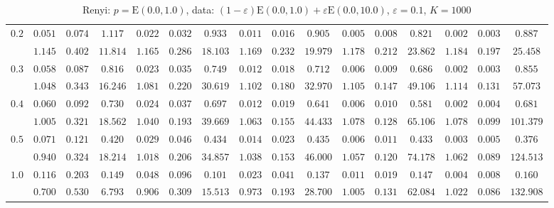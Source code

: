 \begin{table}[ht]
\begin{center}
\begin{tabular}{|c|ccc|ccc|ccc|ccc|ccc|}
\hline 
$0.2$ & $ 0.051 $ & $ 0.074 $ & $ 1.117 $ & $ 0.022 $ & $ 0.032 $ & $ 0.933 $ & $ 0.011 $ & $ 0.016 $ & $ 0.905 $ & $ 0.005 $ & $ 0.008 $ & $ 0.821 $ & $ 0.002 $ & $ 0.003 $ & $ 0.887 $\\ 
 & $ 1.145 $ & $ 0.402 $ & $ 11.814 $ & $ 1.165 $ & $ 0.286 $ & $ 18.103 $ & $ 1.169 $ & $ 0.232 $ & $ 19.979 $ & $ 1.178 $ & $ 0.212 $ & $ 23.862 $ & $ 1.184 $ & $ 0.197 $ & $ 25.458 $\\ 
\hline 
$0.3$ & $ 0.058 $ & $ 0.087 $ & $ 0.816 $ & $ 0.023 $ & $ 0.035 $ & $ 0.749 $ & $ 0.012 $ & $ 0.018 $ & $ 0.712 $ & $ 0.006 $ & $ 0.009 $ & $ 0.686 $ & $ 0.002 $ & $ 0.003 $ & $ 0.855 $\\ 
 & $ 1.048 $ & $ 0.343 $ & $ 16.246 $ & $ 1.081 $ & $ 0.220 $ & $ 30.619 $ & $ 1.102 $ & $ 0.180 $ & $ 32.970 $ & $ 1.105 $ & $ 0.147 $ & $ 49.106 $ & $ 1.114 $ & $ 0.131 $ & $ 57.073 $\\ 
\hline 
$0.4$ & $ 0.060 $ & $ 0.092 $ & $ 0.730 $ & $ 0.024 $ & $ 0.037 $ & $ 0.697 $ & $ 0.012 $ & $ 0.019 $ & $ 0.641 $ & $ 0.006 $ & $ 0.010 $ & $ 0.581 $ & $ 0.002 $ & $ 0.004 $ & $ 0.681 $\\ 
 & $ 1.005 $ & $ 0.321 $ & $ 18.562 $ & $ 1.040 $ & $ 0.193 $ & $ 39.669 $ & $ 1.063 $ & $ 0.155 $ & $ 44.433 $ & $ 1.078 $ & $ 0.128 $ & $ 65.106 $ & $ 1.078 $ & $ 0.099 $ & $ 101.379 $\\ 
\hline 
$0.5$ & $ 0.071 $ & $ 0.121 $ & $ 0.420 $ & $ 0.029 $ & $ 0.046 $ & $ 0.434 $ & $ 0.014 $ & $ 0.023 $ & $ 0.435 $ & $ 0.006 $ & $ 0.011 $ & $ 0.433 $ & $ 0.003 $ & $ 0.005 $ & $ 0.376 $\\ 
 & $ 0.940 $ & $ 0.324 $ & $ 18.214 $ & $ 1.018 $ & $ 0.206 $ & $ 34.857 $ & $ 1.038 $ & $ 0.153 $ & $ 46.000 $ & $ 1.057 $ & $ 0.120 $ & $ 74.178 $ & $ 1.062 $ & $ 0.089 $ & $ 124.513 $\\ 
\hline 
$1.0$ & $ 0.116 $ & $ 0.203 $ & $ 0.149 $ & $ 0.048 $ & $ 0.096 $ & $ 0.101 $ & $ 0.023 $ & $ 0.041 $ & $ 0.137 $ & $ 0.011 $ & $ 0.019 $ & $ 0.147 $ & $ 0.004 $ & $ 0.008 $ & $ 0.160 $\\ 
 & $ 0.700 $ & $ 0.530 $ & $ 6.793 $ & $ 0.906 $ & $ 0.309 $ & $ 15.513 $ & $ 0.973 $ & $ 0.193 $ & $ 28.700 $ & $ 1.005 $ & $ 0.131 $ & $ 62.084 $ & $ 1.022 $ & $ 0.086 $ & $ 132.908 $\\ 
\hline 
\end{tabular}
\caption{Renyi: $p = \mathrm{E}(0.0,1.0)$, data: $(1-\varepsilon)\mathrm{E}(0.0,1.0) + \varepsilon \mathrm{E}(0.0,10.0)$, $\varepsilon =  0.1$, $K = 1000$} 
\end{center}
\end{table}

